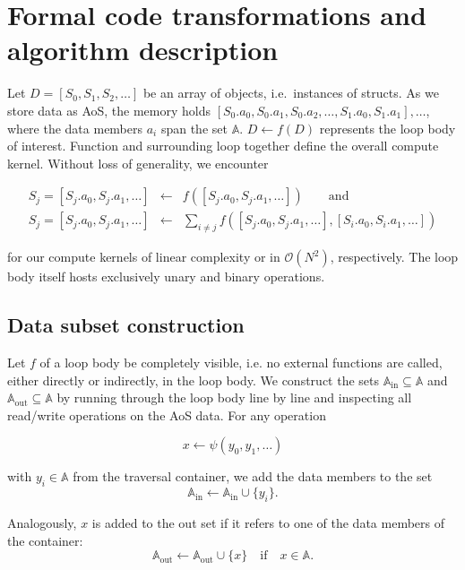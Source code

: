 \section{Formal code transformations and algorithm description}
\label{section:formalism}


Let $D = [S_0,S_1,S_2,\ldots]$ be an array of objects, i.e.~instances of structs.
As we store data as AoS, the memory holds $[S_0.a_0,S_0.a_1,S_0.a_2,\ldots,S_1.a_0,S_1.a_1],\ldots$, where the data members $a_i$ span the set $\mathbb{A}$.
$ D \gets f(D)$ represents the loop body of interest.
Function and surrounding loop together define the overall compute kernel.
Without loss of generality, we encounter

\begin{eqnarray*}
  S_j = [S_j.a_0, S_j.a_1, \ldots] & \gets & f([S_j.a_0, S_j.a_1, \ldots]) \qquad \text{and} \\
  S_j = [S_j.a_0, S_j.a_1, \ldots] & \gets & \sum _{i\not=j} f([S_j.a_0, S_j.a_1, \ldots],[S_i.a_0, S_i.a_1, \ldots])
\end{eqnarray*}

\noindent
for our compute kernels of linear complexity or in $\mathcal{O}(N^2)$, respectively.
The loop body itself hosts exclusively unary and binary operations.


\subsection{Data subset construction}

Let $f$ of a loop body be completely visible, i.e. no external functions are called, either directly or indirectly, in the loop body.
We construct the sets $\mathbb{A}_{\text{in}} \subseteq \mathbb{A}$ and $\mathbb{A}_{\text{out}} \subseteq \mathbb{A}$ by running through the loop body line by line and inspecting all read/write operations on the AoS data.
For any operation

\begin{equation}
 x \gets \psi(y_0,y_1,\ldots)
 \label{equation:formalism:assignment}
\end{equation}

\noindent
with $y_i \in \mathbb{A}$ from the traversal container, we add the data members to the set 
\[
 \mathbb{A}_{\text{in}} \gets \mathbb{A}_{\text{in}} \cup \{ y_i \}.
\]

\noindent
Analogously, $x$ is added to the out set if it refers to one of the data members of the container:
\[
 \mathbb{A}_{\text{out}} \gets \mathbb{A}_{\text{out}} \cup \{ x \} \quad \text{if} \quad x \in \mathbb{A}.
\]


